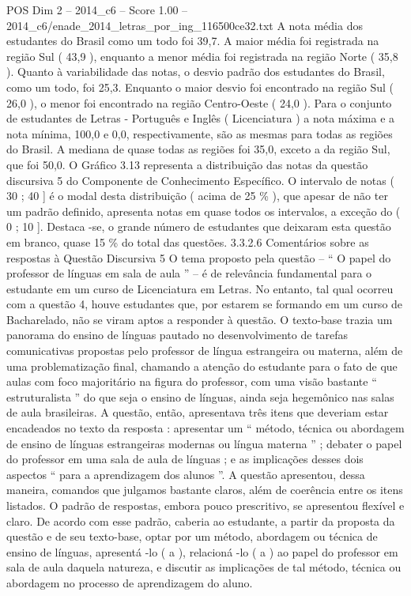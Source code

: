 \begin{textsample}{POS Dim 2 – 2014\_c6 – Score 1.00 – 2014\_c6/enade\_2014\_letras\_por\_ing\_116500ce32.txt}
A nota média dos estudantes do Brasil como um todo foi 39,7.
A maior média foi registrada na região Sul ( 43,9 ), enquanto a menor média foi registrada na região Norte ( 35,8 ).
Quanto à variabilidade das notas, o desvio padrão dos estudantes do Brasil, como um todo, foi 25,3.
Enquanto o maior desvio foi encontrado na região Sul ( 26,0 ), o menor foi encontrado na região Centro-Oeste ( 24,0 ).
Para o conjunto de estudantes de Letras - Português e Inglês ( Licenciatura ) a nota máxima e a nota mínima, 100,0 e 0,0, respectivamente, são as mesmas para todas as regiões do Brasil.
A mediana de quase todas as regiões foi 35,0, exceto a da região Sul, que foi 50,0.
O Gráfico 3.13 representa a distribuição das notas da questão discursiva 5 do Componente de Conhecimento Específico.
O intervalo de notas ( 30 ; 40 ] é o modal desta distribuição ( acima de 25 \% ), que apesar de não ter um padrão definido, apresenta notas em quase todos os intervalos, a exceção do ( 0 ; 10 ].
Destaca -se, o grande número de estudantes que deixaram esta questão em branco, quase 15 \% do total das questões. 3.3.2.6 Comentários sobre as respostas à Questão Discursiva 5 O tema proposto pela questão – “ O papel do professor de línguas em sala de aula ” – é de relevância fundamental para o estudante em um curso de Licenciatura em Letras.
No entanto, tal qual ocorreu com a questão 4, houve estudantes que, por estarem se formando em um curso de Bacharelado, não se viram aptos a responder à questão.
O texto-base trazia um panorama do ensino de línguas pautado no desenvolvimento de tarefas comunicativas propostas pelo professor de língua estrangeira ou materna, além de uma problematização final, chamando a atenção do estudante para o fato de que aulas com foco majoritário na figura do professor, com uma visão bastante “ estruturalista ” do que seja o ensino de línguas, ainda seja hegemônico nas salas de aula brasileiras.
A questão, então, apresentava três itens que deveriam estar encadeados no texto da resposta : apresentar um “ método, técnica ou abordagem de ensino de línguas estrangeiras modernas ou língua materna ” ; debater o papel do professor em uma sala de aula de línguas ; e as implicações desses dois aspectos “ para a aprendizagem dos alunos ”.
A questão apresentou, dessa maneira, comandos que julgamos bastante claros, além de coerência entre os itens listados.
O padrão de respostas, embora pouco prescritivo, se apresentou flexível e claro.
De acordo com esse padrão, caberia ao estudante, a partir da proposta da questão e de seu texto-base, optar por um método, abordagem ou técnica de ensino de línguas, apresentá -lo ( a ), relacioná -lo ( a ) ao papel do professor em sala de aula daquela natureza, e discutir as implicações de tal método, técnica ou abordagem no processo de aprendizagem do aluno.

\end{textsample}
